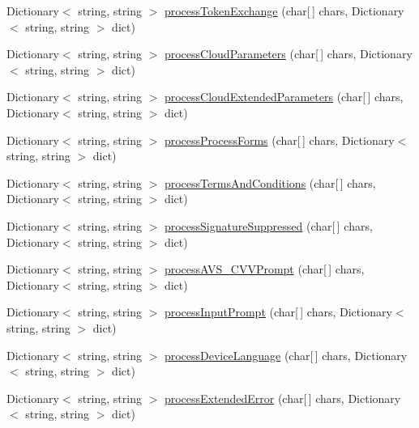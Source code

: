 \begin{DoxyCompactItemize}
\item 
Dictionary$<$ string, string $>$ \mbox{\hyperlink{class_form_sim_1_1_t_c_p_handler_a5702eb572a0e7005cbe2bca58e591217}{process\+Token\+Exchange}} (char\mbox{[}$\,$\mbox{]} chars, Dictionary$<$ string, string $>$ dict)
\item 
Dictionary$<$ string, string $>$ \mbox{\hyperlink{class_form_sim_1_1_t_c_p_handler_a254b2c9aa486ecb07a994c417b20ff97}{process\+Cloud\+Parameters}} (char\mbox{[}$\,$\mbox{]} chars, Dictionary$<$ string, string $>$ dict)
\item 
Dictionary$<$ string, string $>$ \mbox{\hyperlink{class_form_sim_1_1_t_c_p_handler_a2cf69e45fed60fcef0c84fa7c98457e0}{process\+Cloud\+Extended\+Parameters}} (char\mbox{[}$\,$\mbox{]} chars, Dictionary$<$ string, string $>$ dict)
\item 
Dictionary$<$ string, string $>$ \mbox{\hyperlink{class_form_sim_1_1_t_c_p_handler_a3c2ddf21f92119ce435af5c3fbdb13b6}{process\+Process\+Forms}} (char\mbox{[}$\,$\mbox{]} chars, Dictionary$<$ string, string $>$ dict)
\item 
Dictionary$<$ string, string $>$ \mbox{\hyperlink{class_form_sim_1_1_t_c_p_handler_a3bd58ccb4d3137a26b8bd14080649bd4}{process\+Terms\+And\+Conditions}} (char\mbox{[}$\,$\mbox{]} chars, Dictionary$<$ string, string $>$ dict)
\item 
Dictionary$<$ string, string $>$ \mbox{\hyperlink{class_form_sim_1_1_t_c_p_handler_abbdc5072d534ac620abb7d9a48ba30a2}{process\+Signature\+Suppressed}} (char\mbox{[}$\,$\mbox{]} chars, Dictionary$<$ string, string $>$ dict)
\item 
Dictionary$<$ string, string $>$ \mbox{\hyperlink{class_form_sim_1_1_t_c_p_handler_ae6509869559cd7fac4e13e861510cc4b}{process\+A\+V\+S\+\_\+\+C\+V\+V\+Prompt}} (char\mbox{[}$\,$\mbox{]} chars, Dictionary$<$ string, string $>$ dict)
\item 
Dictionary$<$ string, string $>$ \mbox{\hyperlink{class_form_sim_1_1_t_c_p_handler_af9f544ae7073b4365be05307e9eae86a}{process\+Input\+Prompt}} (char\mbox{[}$\,$\mbox{]} chars, Dictionary$<$ string, string $>$ dict)
\item 
Dictionary$<$ string, string $>$ \mbox{\hyperlink{class_form_sim_1_1_t_c_p_handler_a08ab2569308a7bd09e5db8cd6d408459}{process\+Device\+Language}} (char\mbox{[}$\,$\mbox{]} chars, Dictionary$<$ string, string $>$ dict)
\item 
Dictionary$<$ string, string $>$ \mbox{\hyperlink{class_form_sim_1_1_t_c_p_handler_aadbaeefbb8bb128261c7cbf85be9c91c}{process\+Extended\+Error}} (char\mbox{[}$\,$\mbox{]} chars, Dictionary$<$ string, string $>$ dict)

\end{DoxyCompactItemize}
